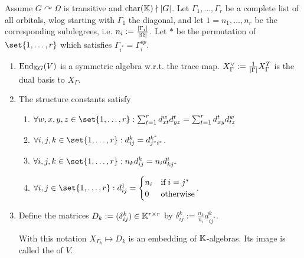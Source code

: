 \documentclass[fontsize=11pt,fleqn,a4paper]{scrartcl}
\begin{document}
\begin{theoremdef}
Assume $G\curvearrowright\Omega$ is transitive and $\operatorname{char}(\mathbb{K}) \nmid \lvert G\rvert$. Let $\Gamma_1,\ldots,\Gamma_r$ be a complete list of all orbitals, wlog starting with $\Gamma_1$ the diagonal, and let $1=n_1, \ldots, n_r$ be the corresponding subdegrees, i.e. $n_i:=\frac{\lvert\Gamma_i\rvert}{\lvert\Omega\rvert}$. Let $\ast$ be the permutation of $\set{1,\ldots,r}$ which satisfies $\Gamma_{i^\ast} = \Gamma_i^{op}$.
\begin{enumerate}
\item $\operatorname{End}_{\mathbb{K} G}(V)$ is a symmetric algebra w.r.t. the trace map. $X_\Gamma^\vee := \frac{1}{\lvert\Gamma\rvert}X_\Gamma^T$ is the dual basis to $X_\Gamma$.
\item The structure constants satisfy
	\begin{enumerate}
	\item $\forall w,x,y,z\in\set{1,\ldots,r}: \sum_{t=1}^r d_{xt}^w d_{yz}^t = \sum_{t=1}^r d_{xy}^t d_{tz}^w$
	\item $\forall i,j,k\in\set{1,\ldots,r}: d_{ij}^k = d_{j^\ast i^\ast}^{k^\ast}$.
	\item $\forall i,j,k\in\set{1,\ldots,r}: n_k d_{ij}^k = n_i d_{kj^\ast}^i$
	\item $\forall i,j\in\set{1,\ldots,r}: d_{ij}^1 = \begin{cases} n_i & \text{if}\;i = j^\ast \\ 0 & \text{otherwise}\end{cases}$.
	\end{enumerate}
\item Define the matrices $D_k := (\delta_{ij}^k) \in \mathbb{K}^{r\times r}$ by $\delta_{ij}^k := \tfrac{n_k}{n_i}d_{ij^\ast}^k$.

With this notation $X_{\Gamma_k} \mapsto D_k$ is an embedding of $\mathbb{K}$-algebras. Its image is called the  of $V$.
\end{enumerate}
\end{theoremdef}
\end{document}
